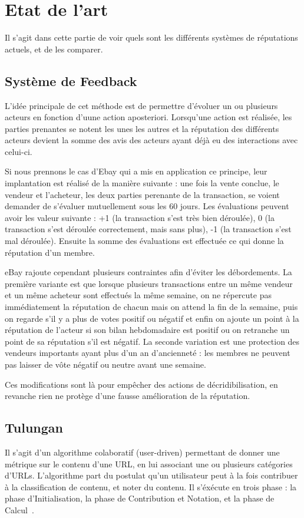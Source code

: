 \documentclass[a4paper, 11pt]{article} %
\begin{document}
\section{Etat de l'art}
Il s'agit dans cette partie de voir quels sont les différents systèmes de réputations actuels, et de les comparer.

\subsection{Système de Feedback}
L'idée principale de cet méthode est de permettre d'évoluer un ou plusieurs acteurs en fonction d'uune action aposteriori.
Lorsqu'une action est réalisée, les parties prenantes se notent les unes les autres et la réputation des différents acteurs devient la somme des avis des acteurs ayant déjà eu des interactions avec celui-ci.

Si nous prennons le cas d'Ebay qui a mis en application ce principe, leur implantation est réalisé de la manière suivante : une fois la vente conclue, le vendeur et l'acheteur, les deux parties perenante de la transaction, se voient demander de s'évaluer mutuellement sous les 60 jours.
Les évaluations peuvent avoir les valeur suivante : +1 (la transaction s'est très bien déroulée), 0 (la transaction s'est déroulée correctement, mais sans plus), -1 (la transaction s'est mal déroulée).
Ensuite la somme des évaluations est effectuée ce qui donne la réputation d'un membre.

eBay rajoute cependant plusieurs contraintes afin d'éviter les débordements.
La première variante est que lorsque plusieurs transactions entre un même vendeur et un même acheteur sont effectués la même semaine, on ne répercute pas immédiatement la réputation de chacun mais on attend la fin de la semaine, puis on regarde s'il y a plus de votes positif ou négatif et enfin on ajoute un point à la réputation de l'acteur si son bilan hebdomadaire est positif ou on retranche un point de sa réputation s'il est négatif.
La seconde variation est une protection des vendeurs importants ayant plus d'un an d'ancienneté : les membres ne peuvent pas laisser de vôte négatif ou neutre avant une semaine.

Ces modifications sont là pour empêcher des actions de décridibilisation, en revanche rien ne protège d'une fausse amélioration de la réputation.

\subsection{Tulungan}
Il s'agit d'un algorithme colaboratif (user-driven) permettant de donner une métrique sur le contenu d'une URL, en lui associant une ou plusieurs catégories d'URLs.
L'algorithme part du postulat qu'un utilisateur peut à la fois contribuer à la classification de contenu, et noter du contenu.
Il s'éxécute en trois phase : la phase d'Initialisation, la phase de Contribution et Notation, et la phase de Calcul~\cite{Tulungan2013}.
\end{document}
